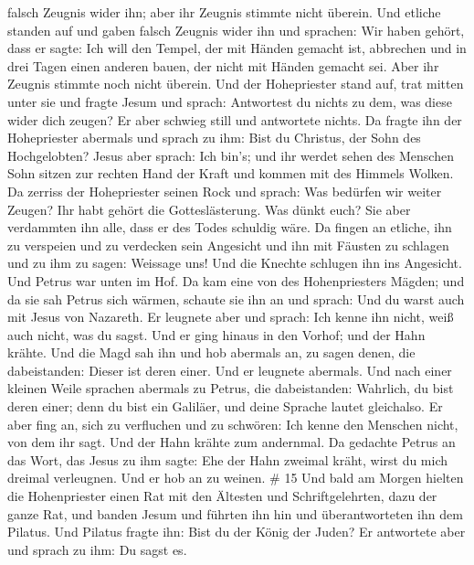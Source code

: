 falsch Zeugnis wider ihn; aber ihr Zeugnis stimmte nicht überein.
 Und etliche standen auf und gaben falsch Zeugnis wider ihn
und sprachen:  Wir haben gehört, dass er sagte: Ich will
den Tempel, der mit Händen gemacht ist, abbrechen und in drei Tagen
einen anderen bauen, der nicht mit Händen gemacht sei. 
Aber ihr Zeugnis stimmte noch nicht überein.  Und der
Hohepriester stand auf, trat mitten unter sie und fragte Jesum und
sprach: Antwortest du nichts zu dem, was diese wider dich zeugen?
 Er aber schwieg still und antwortete nichts. Da fragte ihn
der Hohepriester abermals und sprach zu ihm: Bist du Christus, der Sohn
des Hochgelobten?  Jesus aber sprach: Ich bin's; und ihr
werdet sehen des Menschen Sohn sitzen zur rechten Hand der Kraft und
kommen mit des Himmels Wolken.  Da zerriss der Hohepriester
seinen Rock und sprach: Was bedürfen wir weiter Zeugen? 
Ihr habt gehört die Gotteslästerung. Was dünkt euch? Sie aber verdammten
ihn alle, dass er des Todes schuldig wäre.  Da fingen an
etliche, ihn zu verspeien und zu verdecken sein Angesicht und ihn mit
Fäusten zu schlagen und zu ihm zu sagen: Weissage uns! Und die Knechte
schlugen ihn ins Angesicht.  Und Petrus war unten im Hof.
Da kam eine von des Hohenpriesters Mägden;  und da sie sah
Petrus sich wärmen, schaute sie ihn an und sprach: Und du warst auch mit
Jesus von Nazareth.  Er leugnete aber und sprach: Ich kenne
ihn nicht, weiß auch nicht, was du sagst. Und er ging hinaus in den
Vorhof; und der Hahn krähte.  Und die Magd sah ihn und hob
abermals an, zu sagen denen, die dabeistanden: Dieser ist deren einer.
 Und er leugnete abermals. Und nach einer kleinen Weile
sprachen abermals zu Petrus, die dabeistanden: Wahrlich, du bist deren
einer; denn du bist ein Galiläer, und deine Sprache lautet gleichalso.
 Er aber fing an, sich zu verfluchen und zu schwören: Ich
kenne den Menschen nicht, von dem ihr sagt.  Und der Hahn
krähte zum andernmal. Da gedachte Petrus an das Wort, das Jesus zu ihm
sagte: Ehe der Hahn zweimal kräht, wirst du mich dreimal verleugnen. Und
er hob an zu weinen. \# 15  Und bald am Morgen hielten die
Hohenpriester einen Rat mit den Ältesten und Schriftgelehrten, dazu der
ganze Rat, und banden Jesum und führten ihn hin und überantworteten ihn
dem Pilatus.  Und Pilatus fragte ihn: Bist du der König der
Juden? Er antwortete aber und sprach zu ihm: Du sagst es. 
